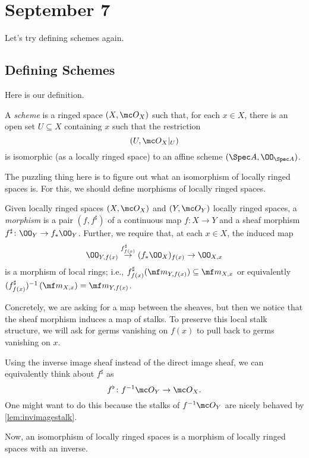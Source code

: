 \documentclass[../notes.tex]{subfiles}
\begin{document}
\section{September 7}
Let's try defining schemes again.

\subsection{Defining Schemes}
Here is our definition.
\begin{definition}[Scheme]
	A \textit{scheme} is a ringed space $(X,\mc O_X)$ such that, for each $x\in X$, there is an open set $U\subseteq X$ containing $x$ such that the restriction
	\[(U,\mc O_X|_U)\]
	is isomorphic (as a locally ringed space) to an affine scheme $(\Spec A,\OO_{\Spec A})$.
\end{definition}
The puzzling thing here is to figure out what an isomorphism of locally ringed spaces is. For this, we should define morphisms of locally ringed spaces.
\begin{definition}
	Given locally ringed spaces $(X,\mc O_X)$ and $(Y,\mc O_Y)$ locally ringed spaces, a \textit{morphism} is a pair $(f,f^\sharp)$ of a continuous map $f\colon X\to Y$ and a sheaf morphism $f^\sharp\colon\OO_Y\to f_*\OO_Y$. Further, we require that, at each $x\in X$, the induced map
	\[\OO_{Y,f(x)}\stackrel{f^\sharp_{f(x)}}\to(f_*\OO_X)_{f(x)}\to\OO_{X,x}\]
	is a morphism of local rings; i.e., $f^\sharp_{f(x)}(\mf m_{Y,f(x)})\subseteq\mf m_{X,x}$ or equivalently $(f^\sharp_{f(x)})^{-1}\left(\mf m_{X,x}\right)=\mf m_{Y,f(x)}$.
\end{definition}
Concretely, we are asking for a map between the sheaves, but then we notice that the sheaf morphism induces a map of stalks. To preserve this local stalk structure, we will ask for germs vanishing on $f(x)$ to pull back to germs vanishing on $x$.
\begin{remark}
	Using the inverse image sheaf instead of the direct image sheaf, we can equivalently think about $f^\sharp$ as
	\[f^\flat\colon f^{-1}\mc O_Y\to\mc O_X.\]
	One might want to do this because the stalks of $f^{-1}\mc O_Y$ are nicely behaved by \autoref{lem:invimagestalk}.
\end{remark}
Now, an isomorphism of locally ringed spaces is a morphism of locally ringed spaces with an inverse.
\end{document}
